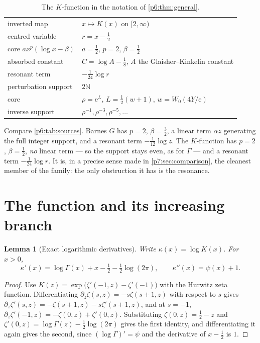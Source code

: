 \documentclass[11pt,a4paper,oneside]{book}
\theoremstyle{plain}
\newtheorem{lemma}[theorem]{Lemma}
\theoremstyle{definition}
\theoremstyle{remark}
\newcommand{\Nat}{\mathbb{N}}
\newcommand{\e}{\mathrm{e}}
\newcommand{\Wlam}{W}
\begin{document}
\begin{table}[htbp]
\centering
\caption{The $K$-function in the notation of \cref{p6:thm:general}.}
\label{p7:tab:sources}
\small
\begin{tabular}{@{}ll@{}}
\toprule
inverted map & $x\mapsto K(x)$ on $[2,\infty)$\\
centred variable & $r=x-\tfrac12$\\
core $a x^{p}(\log x-\beta)$ & $a=\tfrac12$, $p=2$, $\beta=\tfrac12$\\
absorbed constant & $C=\log A-\tfrac18$, $A$ the Glaisher--Kinkelin constant\\
resonant term & $-\tfrac1{24}\log r$\\
perturbation support & $2\Nat$\\
core & $\rho=\e^{L}$, $L=\tfrac12(w+1)$, $w=\Wlam_0(4Y/\e)$\\
inverse support & $\rho^{-1},\rho^{-3},\rho^{-5},\dots$\\
\bottomrule
\end{tabular}
\end{table}

Compare \cref{p6:tab:sources}.  Barnes $G$ has $p=2$, $\beta=\tfrac32$, a
linear term $\alpha z$ generating the full integer support, and a resonant
term $-\tfrac1{12}\log z$.  The $K$-function has $p=2$, $\beta=\tfrac12$,
\emph{no} linear term --- so the support stays even, as for $\Gamma$ --- and a
resonant term $-\tfrac1{24}\log r$.  It is, in a precise sense made in
\cref{p7:sec:comparison}, the cleanest member of the family: the only
obstruction it has is the resonance.

\section{The function and its increasing branch}
\label{p7:sec:function}

\begin{lemma}[Exact logarithmic derivatives]\label{p7:lem:derivatives}
Write $\kappa(x)=\log K(x)$.  For $x>0$,
\begin{equation}\label{p7:eq:kappa-prime}
 \kappa'(x)=\log\Gamma(x)+x-\tfrac12-\tfrac12\log(2\pi),
 \qquad
 \kappa''(x)=\psi(x)+1 .
\end{equation}
\end{lemma}

\begin{proof}
Use $K(z)=\exp\bigl(\zeta'(-1,z)-\zeta'(-1)\bigr)$ with the Hurwitz zeta
function.  Differentiating $\partial_z\zeta(s,z)=-s\zeta(s+1,z)$ with respect
to $s$ gives $\partial_z\zeta'(s,z)=-\zeta(s+1,z)-s\zeta'(s+1,z)$, and at
$s=-1$,
$\partial_z\zeta'(-1,z)=-\zeta(0,z)+\zeta'(0,z)$.  Substituting
$\zeta(0,z)=\tfrac12-z$ and
$\zeta'(0,z)=\log\Gamma(z)-\tfrac12\log(2\pi)$ gives the first identity, and
differentiating it again gives the second, since
$(\log\Gamma)'=\psi$ and the derivative of $x-\tfrac12$ is $1$.
\end{proof}
\end{document}
